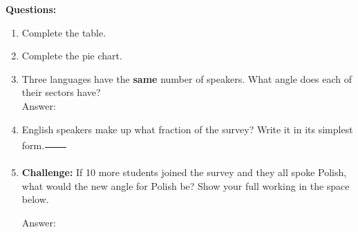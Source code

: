 \documentclass[a4paper,12pt]{article}
\newcommand{\ansbox}{\underline{\hspace{1.6cm}}}
\begin{document}
\vspace{6pt}
\noindent\textbf{Questions:}
\begin{enumerate}[leftmargin=1.6em, itemsep=3pt]
  \item Complete the table.
  \item Complete the pie chart.
  \item Three languages have the \textbf{same} number of speakers. What angle does each of their sectors have?
        \vspace{0.6cm}\\
        \hspace*{1.6em}Answer: \ansbox\textdegree
  \item English speakers make up what fraction of the survey? Write it in its simplest form.\quad $\dfrac{\phantom{ABC}}{\phantom{ABC}}$
  \item \textbf{Challenge:} If 10 more students joined the survey and they all spoke Polish, what would the new angle for Polish be? Show your full working in the space below.

  \vspace{10em}

  
  Answer: \ansbox\textdegree
\end{enumerate}

\newpage
\end{document}
